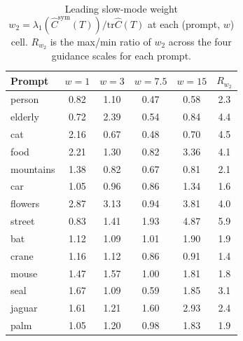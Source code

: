 \documentclass{article}
\newcommand{\tr}{\mathrm{tr}}
\begin{document}
\begin{table}[t]
\centering
\caption{Leading slow-mode weight $w_2 = \lambda_1(\hat C^{\mathrm{sym}}(T))/\tr\hat C(T)$ at each (prompt, $w$) cell. $R_{w_2}$ is the max/min ratio of $w_2$ across the four guidance scales for each prompt.}
\label{tab:weight_comparability_w2}
\setlength{\tabcolsep}{4pt}
\begin{tabular}{l|cccc|c}
\toprule
Prompt & $w{=}1$ & $w{=}3$ & $w{=}7.5$ & $w{=}15$ & $R_{w_2}$ \\
\midrule
person & 0.82 & 1.10 & 0.47 & 0.58 & 2.3 \\
elderly & 0.72 & 2.39 & 0.54 & 0.84 & 4.4 \\
cat & 2.16 & 0.67 & 0.48 & 0.70 & 4.5 \\
food & 2.21 & 1.30 & 0.82 & 3.36 & 4.1 \\
mountains & 1.38 & 0.82 & 0.67 & 0.81 & 2.1 \\
car & 1.05 & 0.96 & 0.86 & 1.34 & 1.6 \\
flowers & 2.87 & 3.13 & 0.94 & 3.81 & 4.0 \\
street & 0.83 & 1.41 & 1.93 & 4.87 & 5.9 \\
\midrule
bat & 1.12 & 1.09 & 1.01 & 1.90 & 1.9 \\
crane & 1.16 & 1.12 & 0.86 & 0.91 & 1.4 \\
mouse & 1.47 & 1.57 & 1.00 & 1.81 & 1.8 \\
seal & 1.67 & 1.09 & 0.59 & 1.85 & 3.1 \\
jaguar & 1.61 & 1.21 & 1.60 & 2.93 & 2.4 \\
palm & 1.05 & 1.20 & 0.98 & 1.83 & 1.9 \\
\bottomrule
\end{tabular}
\end{table}
\end{document}
